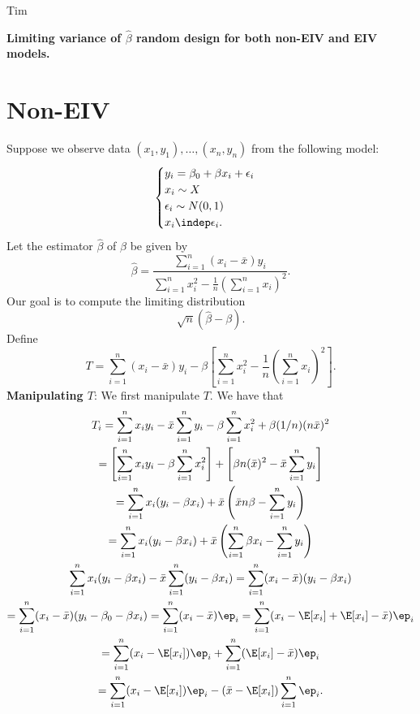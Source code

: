 \documentclass[12pt]{article}
\begin{document}
\noindent
Tim\\
\begin{center}
\textbf{Limiting variance of $\hat{\beta}$ random design for both non-EIV and EIV models.}
\end{center}

\section{Non-EIV}
Suppose we observe data $(x_1, y_1), \dots, (x_n, y_n)$ from the following model:
$$
\begin{cases}
y_i = \beta_0 + \beta x_i + \epsilon_i \\
x_i \sim X \\
\epsilon_i \sim N(0,1) \\
x_i \indep \epsilon_i.
\end{cases}
$$
Let the estimator $\hat{\beta}$ of $\beta$ be given by
$$\hat{\beta} = \frac{ \sum_{i=1}^n (x_i - \bar{x}) y_i }{ \sum_{i=1}^n x_i^2 - \frac{1}{n}\left( \sum_{i=1}^n x_i \right)^2}.$$
Our goal is to compute the limiting distribution
$$\sqrt{n} \left( \hat{\beta} - \beta \right).$$
Define
$$ T= \sum_{i=1}^n (x_i - \bar{x}) y_i - \beta \left[ \sum_{i=1}^n x_i^2 - \frac{1}{n}\left( \sum_{i=1}^n x_i \right)^2 \right].$$
\noindent
\textbf{Manipulating $T$}: We first manipulate $T$. We have that
\begin{multline*}
T_i = \sum_{i=1}^n x_i y_i - \bar{x}\sum_{i=1}^n y_i - \beta \sum_{i=1}^n x_i^2 + \beta(1/n) (n \bar{x})^2 \\ = \left[ \sum_{i=1}^n x_iy_i - \beta \sum_{i=1}^n x_i^2 \right] + \left[ \beta n (\bar{x})^2 - \bar{x} \sum_{i=1}^n y_i \right] \\ = \sum_{i=1}^n x_i(y_i - \beta x_i) + \bar{x} \left( \bar{x} n \beta - \sum_{i=1}^n y_i \right) \\ = \sum_{i=1}^n x_i(y_i - \beta x_i) + \bar{x} \left( \sum_{i=1}^n \beta x_i - \sum_{i=1}^n y_i \right) \\ \sum_{i=1}^n x_i(y_i - \beta x_i) - \bar{x}\sum_{i=1}^n (y_i - \beta x_i) = \sum_{i=1}^n (x_i - \bar{x}) (y_i -\beta x_i) \\ = \sum_{i=1}^n (x_i - \bar{x})( y_i - \beta_0 - \beta x_i) = \sum_{i=1}^n (x_i - \bar{x})\ep_i = \sum_{i=1}^n (x_i - \E[x_i] + \E[x_i] - \bar{x}) \ep_i \\ = \sum_{i=1}^n (x_i - \E[x_i]) \ep_i + \sum_{i=1}^n ( \E[x_i] - \bar{x}) \ep_i \\ = \sum_{i=1}^n (x_i - \E[x_i]) \ep_i - (\bar{x} - \E[x_i]) \sum_{i=1}^n \ep_i.
\end{multline*}
\end{document}
